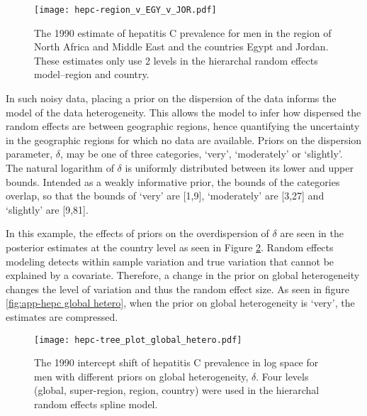     \begin{figure}[h]
        \begin{center}
            \texttt{[image: hepc-region\_v\_EGY\_v\_JOR.pdf]}
            \caption{The 1990 estimate of hepatitis C prevalence for men in the region of North Africa and Middle East and the countries Egypt and Jordan.  These estimates only use 2 levels in the hierarchal random effects model--region and country.}
            \label{fig:app-hepc regional rfx}
        \end{center}
    \end{figure}

In such noisy data, placing a prior on the dispersion of the data
informs the model of the data heterogeneity.  This allows the model to
infer how dispersed the random effects are between geographic regions,
hence quantifying the uncertainty in the geographic regions for which
no data are available.  Priors on the dispersion parameter, $\delta$,
may be one of three categories, `very', `moderately' or `slightly'.
The natural logarithm of $\delta$ is uniformly distributed between its
lower and upper bounds.  Intended as a weakly informative prior, the
bounds of the categories overlap, so that the bounds of `very' are
[1,9], `moderately' are [3,27] and `slightly' are [9,81].

In this example, the effects of priors on the overdispersion of
$\delta$ are seen in the posterior estimates at the country level as
seen in Figure \ref{fig:app-hepc global hetero}.  Random effects
modeling detects within sample variation and true variation that
cannot be explained by a covariate.  Therefore, a change in the prior
on global heterogeneity changes the level of variation and thus the
random effect size.  As seen in figure \ref{fig:app-hepc global
  hetero}, when the prior on global heterogeneity is `very', the
estimates are compressed.

    \begin{figure}[h]
        \begin{center}
            \texttt{[image: hepc-tree\_plot\_global\_hetero.pdf]}
            \caption{The 1990 intercept shift of hepatitis C
              prevalence in log space for men with different priors on
              global heterogeneity, $\delta$.  Four levels (global,
              super-region, region, country) were used in the
              hierarchal random effects spline model.}
            \label{fig:app-hepc global hetero}
        \end{center}
    \end{figure}


